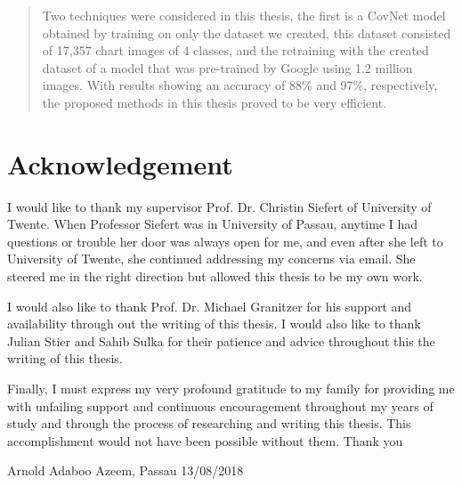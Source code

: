 \begin{titlepage}
\begin{abstract}
Two techniques were considered in this thesis, the first is a CovNet model obtained by training on only the dataset we created, this dataset consisted of 17,357 chart images of 4 classes, and the retraining with the created dataset of a model that was pre-trained by Google using 1.2 million images. With results showing an accuracy of 88\% and 97\%, respectively, the proposed methods in this thesis proved to be very efficient.

\end{abstract}

\section*{Acknowledgement}
I would like to thank my supervisor Prof. Dr. Christin Siefert of University of Twente. When Professor Siefert was in University of Passau, anytime I had questions or trouble her door was always open for me, and even after she left to University of Twente, she continued addressing my concerns via email. She steered me in the right direction but allowed this thesis to be my own work.

I would also like to thank Prof. Dr. Michael Granitzer for his support and availability through out the writing of this thesis. I would also like to thank Julian Stier and Sahib Sulka for their patience and advice throughout this the writing of this thesis.

Finally, I must express my very profound gratitude to my family for providing me with unfailing support and continuous encouragement throughout my years of study and through the process of researching and writing this thesis. This accomplishment would not have been possible without them. Thank you

Arnold Adaboo Azeem, Passau 13/08/2018

\end{titlepage}